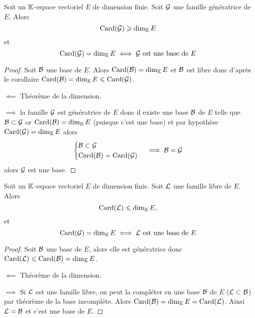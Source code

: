 \begin{theo}
  Soit un \(\mathbb{K}\)-espace vectoriel \(E\) de dimension finie. Soit \(\mathcal{G}\) une famille génératrice de \(E\). Alors
  \begin{equation}
    \operatorname{Card}(\mathcal{G}) \geqslant \operatorname{dim}_{\mathbb{K}} E
  \end{equation}
et
\begin{equation}
  \operatorname{Card}(\mathcal{G})=\operatorname{dim}_{\mathbb{K}} E \iff \mathcal{G} \text{~est une base de } E
\end{equation}
\end{theo}
\begin{proof}
  Soit \(\mathcal{B}\) une base de \(E\). Alors \(\operatorname{Card}(\mathcal{B})=\operatorname{dim}_{\mathbb{K}} E\) et \(\mathcal{B}\) est libre donc d'après le corollaire \(\operatorname{Card}(\mathcal{B}) = \operatorname{dim}_{\mathbb{K}} E \leqslant \operatorname{Card}(\mathcal{G})\).

  \(\impliedby\) Théorème de la dimension.

  \(\implies\) la famille \(\mathcal{G}\) est génératrice de \(E\) donc il existe une base \(\mathcal{B}\) de \(E\) telle que \(\mathcal{B} \subset \mathcal{G}\) or \(\operatorname{Card}(\mathcal{B}) = \operatorname{dim}_{\mathbb{K}} E\) (puisque c'est une base) et par hypothèse \(\operatorname{Card}(\mathcal{G}) = \operatorname{dim}_{\mathbb{K}} E\) alors
  \begin{equation}
    \begin{cases} \mathcal{B} \subset \mathcal{G} \\ \operatorname{Card}(\mathcal{B}) = \operatorname{Card}(\mathcal{G}) \end{cases} \implies \mathcal{B}=\mathcal{G}
  \end{equation}
  alors \(\mathcal{G}\) est une base.
\end{proof}

\begin{theo}
  Soit un \(\mathbb{K}\)-espace vectoriel \(E\) de dimension finie. Soit \(\mathcal{L}\) une famille libre de \(E\). Alors
  \begin{equation}
    \operatorname{Card}(\mathcal{L}) \leqslant \operatorname{dim}_{\mathbb{K}} E,
  \end{equation}
  et
  \begin{equation}
    \operatorname{Card}(\mathcal{G})=\operatorname{dim}_{\mathbb{K}} E \iff \mathcal{L} \text{~est une base de } E
  \end{equation}
\end{theo}
\begin{proof}
  Soit \(\mathcal{B}\) une base de \(E\), alors elle est génératrice donc \(\operatorname{Card}(\mathcal{L}) \leqslant \operatorname{Card}(\mathcal{B})=\operatorname{dim}_{\mathbb{K}} E\).

  \(\impliedby\) Théorème de la dimension.
  
  \(\implies\) Si \(\mathcal{L}\) est une famille libre, on peut la compléter en une base \(\mathcal{B}\) de \(E\) (\(\mathcal{L} \subset \mathcal{B}\)) par théorème de la base incompléte. Alors \(\operatorname{Card}(\mathcal{B})=\operatorname{dim}_{\mathbb{K}} E = \operatorname{Card}(\mathcal{L})\). Ainsi \(\mathcal{L}=\mathcal{B}\) et c'est une base de \(E\).
\end{proof}

